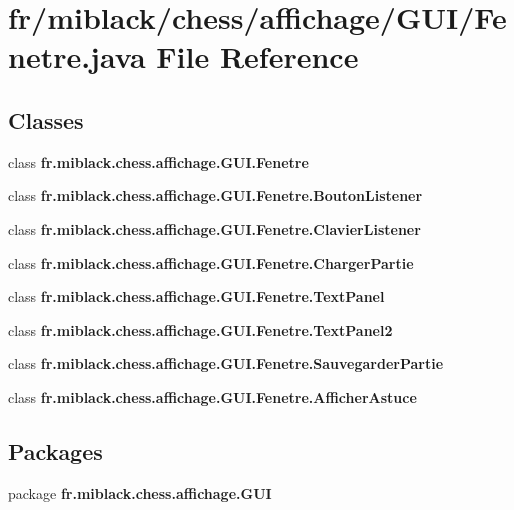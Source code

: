 \section{fr/miblack/chess/affichage/\-G\-U\-I/\-Fenetre.java File Reference}
\label{Fenetre_8java}
\subsection*{Classes}
\begin{DoxyCompactItemize}
\item 
class {\bf fr.\-miblack.\-chess.\-affichage.\-G\-U\-I.\-Fenetre}
\item 
class {\bfseries fr.\-miblack.\-chess.\-affichage.\-G\-U\-I.\-Fenetre.\-Bouton\-Listener}
\item 
class {\bfseries fr.\-miblack.\-chess.\-affichage.\-G\-U\-I.\-Fenetre.\-Clavier\-Listener}
\item 
class {\bfseries fr.\-miblack.\-chess.\-affichage.\-G\-U\-I.\-Fenetre.\-Charger\-Partie}
\item 
class {\bfseries fr.\-miblack.\-chess.\-affichage.\-G\-U\-I.\-Fenetre.\-Text\-Panel}
\item 
class {\bfseries fr.\-miblack.\-chess.\-affichage.\-G\-U\-I.\-Fenetre.\-Text\-Panel2}
\item 
class {\bfseries fr.\-miblack.\-chess.\-affichage.\-G\-U\-I.\-Fenetre.\-Sauvegarder\-Partie}
\item 
class {\bfseries fr.\-miblack.\-chess.\-affichage.\-G\-U\-I.\-Fenetre.\-Afficher\-Astuce}
\end{DoxyCompactItemize}
\subsection*{Packages}
\begin{DoxyCompactItemize}
\item 
package {\bf fr.\-miblack.\-chess.\-affichage.\-G\-U\-I}
\end{DoxyCompactItemize}
